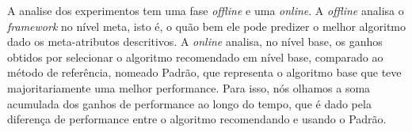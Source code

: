 A analise dos experimentos tem uma fase \textit{offline} e uma \textit{online}. A \textit{offline} analisa o 
\textit{framework} no nível meta, isto é, o quão bem ele pode predizer o melhor algoritmo
dado os meta-atributos descritivos. A \textit{online} analisa, no nível base, os ganhos obtidos por
selecionar o algoritmo recomendado em nível base, comparado ao método de referência, nomeado
Padrão, que representa o algoritmo base que teve majoritariamente uma melhor performance.
Para isso, nós olhamos a soma acumulada dos ganhos de performance ao longo do tempo, que é dado
pela diferença de performance entre o algoritmo recomendando e usando o Padrão.